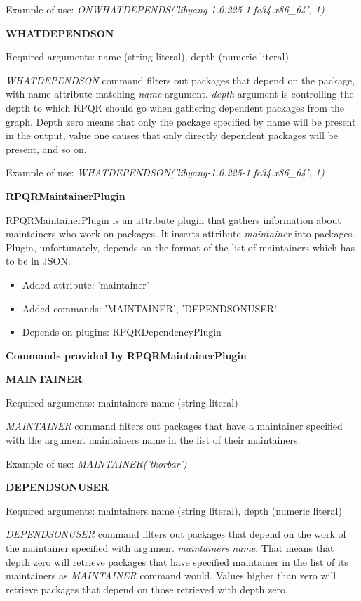 Example of use: \textit{ONWHATDEPENDS('libyang-1.0.225-1.fc34.x86\_64', 1)}

\textbf{WHATDEPENDSON}

Required arguments: name (string literal), depth (numeric literal)

\textit{WHATDEPENDSON} command filters out packages that depend on the package, with name attribute matching
\textit{name} argument. \textit{depth} argument is controlling the depth to which RPQR
should go when gathering dependent packages from the graph. Depth zero means that only the package specified
by name will be present in the output, value one causes that only directly dependent packages will be present, and
so on.

Example of use: \textit{WHATDEPENDSON('libyang-1.0.225-1.fc34.x86\_64', 1)}

\textbf{RPQRMaintainerPlugin}

RPQRMaintainerPlugin is an attribute plugin that gathers information about maintainers who work
on packages. It inserts attribute \textit{maintainer} into packages. Plugin, unfortunately, depends
on the format of the list of maintainers which has to be in JSON.

\begin{itemize}
  \item Added attribute: 'maintainer'
  \item Added commands: 'MAINTAINER', 'DEPENDSONUSER'
  \item Depends on plugins: RPQRDependencyPlugin
\end{itemize}

\textbf{Commands provided by RPQRMaintainerPlugin}

\textbf{MAINTAINER}

Required arguments: maintainers name (string literal)

\textit{MAINTAINER} command filters out packages that have a maintainer specified with the argument
maintainers name in the list of their maintainers.

Example of use: \textit{MAINTAINER('tkorbar')}

\textbf{DEPENDSONUSER}

Required arguments: maintainers name (string literal), depth (numeric literal)

\textit{DEPENDSONUSER} command filters out packages that depend on the work of the maintainer specified with
argument \textit{maintainers name}. That means that depth zero will retrieve packages that have specified
maintainer in the list of its maintainers as \textit{MAINTAINER} command would. Values higher than zero
will retrieve packages that depend on those retrieved with depth zero.

